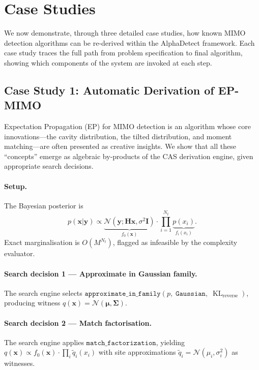 \documentclass[12pt,a4paper]{article}
\newcommand{\bH}{\mathbf{H}}
\newcommand{\bx}{\mathbf{x}}
\newcommand{\by}{\mathbf{y}}
\newcommand{\bI}{\mathbf{I}}
\newcommand{\bmu}{\bm{\mu}}
\newcommand{\bSigma}{\bm{\Sigma}}
\newcommand{\calN}{\mathcal{N}}
\DeclareMathOperator{\KL}{KL}
\begin{document}
\section{Case Studies}
\label{sec:cases}

We now demonstrate, through three detailed case studies, how known MIMO
detection algorithms can be re-derived within the AlphaDetect framework.  Each
case study traces the full path from problem specification to final algorithm,
showing which components of the system are invoked at each step.

\subsection{Case Study 1: Automatic Derivation of EP-MIMO}
\label{sec:ep_derivation}

Expectation Propagation (EP) for MIMO detection \cite{minka2001} is an
algorithm whose core innovations---the cavity distribution, the tilted
distribution, and moment matching---are often presented as creative insights.
We show that all these ``concepts'' emerge as algebraic by-products of the
CAS derivation engine, given appropriate search decisions.

\paragraph{Setup.}
The Bayesian posterior is
\begin{equation}
  p(\bx|\by) \propto \underbrace{\calN(\by;\bH\bx,\sigma^2\bI)}_{f_0(\bx)}
  \cdot \prod_{i=1}^{N_t}\underbrace{p(x_i)}_{f_i(x_i)}.
  \label{eq:posterior}
\end{equation}
Exact marginalisation is $O(M^{N_t})$, flagged as infeasible by the complexity
evaluator.

\paragraph{Search decision 1 --- Approximate in Gaussian family.}
The search engine selects
$\mathtt{approximate\_in\_family}(p,\;\mathtt{Gaussian},\;\KL_\text{reverse})$,
producing witness $q(\bx)=\calN(\bmu,\bSigma)$.

\paragraph{Search decision 2 --- Match factorisation.}
The search engine applies $\mathtt{match\_factorization}$, yielding
$q(\bx)\propto f_0(\bx)\cdot\prod_i \tilde{q}_i(x_i)$
with site approximations $\tilde{q}_i=\calN(\mu_i,\sigma_i^2)$ as witnesses.
\end{document}
